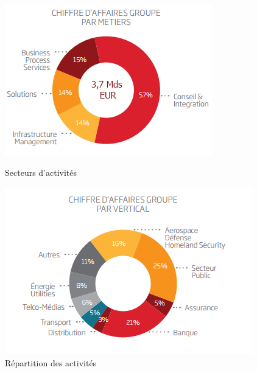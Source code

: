 \begin{figure}[h]
   \begin{minipage}[c]{.45\linewidth}
    \includegraphics[scale=0.9]{images/entreprise/sopraSteriaMetiers.png}
	\centering
	\caption{Secteurs d'activités}
	\label{sopraSteriaActivites}
   \end{minipage} \hfill
   \begin{minipage}[c]{.45\linewidth}
    \includegraphics[scale=0.9]{images/entreprise/sopraSteriaActivites.png}
	\centering
	\caption{Répartition des activités}
	\label{sopraSteriaActivites}
   \end{minipage}
\end{figure}
		